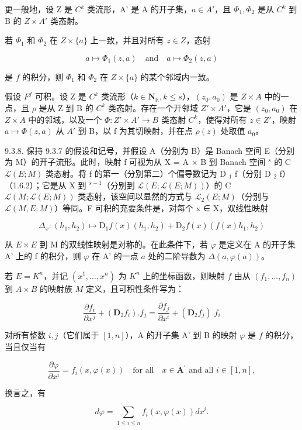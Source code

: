更一般地，设 Z 是 \(C^{k}\) 类流形，A' 是 A 的开子集，\(a \in A'\)，且 \(\Phi_{1}, \Phi_{2}\) 是从 \(C^{k}\) 到 B 的 \(Z \times A'\) 类态射。

若 \(\Phi_{1}\) 和 \(\Phi_{2}\) 在 \(Z \times \{a\}\) 上一致，并且对所有 \(z \in Z\)，态射

\[
a \mapsto \Phi_ {1} (z, a) \quad \text {and} \quad a \mapsto \Phi_ {2} (z, a)
\]

是 \(f\) 的积分，则 \(\Phi_{1}\) 和 \(\Phi_{2}\) 在 \(Z \times \{a\}\) 的某个邻域内一致。

假设 \(F^{f}\) 可积。设 Z 是 \(C^{k}\) 类流形（\(k \in \mathbf{N}_{\mathbb{K}}, k \leqslant s\)），\((z_{0}, a_{0})\) 是 \(Z \times A\) 中的一点，且 \(\rho\) 是从 Z 到 B 的 \(C^{k}\) 类态射。存在一个开邻域 \(Z' \times A'\)，它是 \((z_{0}, a_{0})\) 在 \(Z \times A\) 中的邻域，以及一个 \(\Phi: Z' \times A' \to B\) 类态射 \(C^{k}\)，使得对所有 \(z \in Z'\)，映射 \(a \mapsto \Phi(z, a)\) 从 \(A'\) 到 B，以 f 为其切映射，并在点 \(\rho(z)\) 处取值 \(a_{0}\)。

9.3.8. 保持 9.3.7 的假设和记号，并假设 A（分别为 B）是 Banach 空间 E（分别为 M）的开子流形。此时，映射 f 可视为从 X = A × B 到 Banach 空间 \(^{s}\) 的 C \(\mathcal{L}(E; M)\) 类态射。将 f 的第一（分别第二）个偏导数记为 D \(_{1}\) f（分别 D \(_{2}\) f）（1.6.2）；它是从 X 到 \(^{s-1}\)（分别到 \(\mathcal{L}(E; \mathcal{L}(E; M))\)）的 C \(\mathcal{L}(M; \mathcal{L}(E; M))\) 类态射，该空间以显然的方式与 \(\mathcal{L}_{2}(E; M)\)（分别与 \(\mathcal{L}(M, E; M)\)）等同。F 可积的充要条件是，对每个 x ∈ X，双线性映射

\[
\Delta_ {x}: (h _ {1}, h _ {2}) \mapsto \mathrm{D} _ {1} f (x) (h _ {1}, h _ {2}) + \mathrm{D} _ {2} f (x) (f (x) h _ {1}, h _ {2})
\]

从 \(E \times E\) 到 M 的双线性映射是对称的。在此条件下，若 \(\varphi\) 是定义在 A 的开子集 A' 上的 f 的积分，则 \(\varphi\) 在 A' 的一点 \(a\) 处的二阶导数为 \(\Delta(a,\varphi(a))\)。

若 \(E = K^n\)，并记 \((x^1, \ldots, x^n)\) 为 \(K^n\) 上的坐标函数，则映射 \(f\) 由从 \((f_1, \ldots, f_n)\) 到 \(A \times B\) 的映射族 \(M\) 定义，且可积性条件写为：

\[
\frac {\partial f _ {i}}{\partial x ^ {j}} + (\mathbf {D} _ {2} f _ {i}). f _ {j} = \frac {\partial f _ {j}}{\partial x ^ {i}} + (\mathbf {D} _ {2} f _ {j}). f _ {i}
\]

对所有整数 \(i, j\)（它们属于 \([1, n]\)），A 的开子集 A' 到 B 的映射 \(\varphi\) 是 \(f\) 的积分，当且仅当有

\[
\frac {\partial \varphi}{\partial x ^ {i}} = f _ {i} (x, \varphi (x)) \quad \text {for all} \quad x \in \mathbf {A} ^ {\prime} \text { and all } i \in [ 1, n ],
\]

换言之，有

\[
d \varphi = \sum_ {1 \leqslant i \leqslant n} f _ {i} (x, \varphi (x)) d x ^ {i}.
\]


